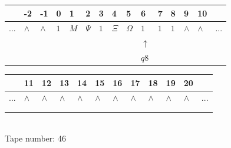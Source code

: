 \documentclass[11pt]{article}
\begin{document}
\begin{table}[H]
\centering
\begin{tabular}{lllllllllllllll}
 & -2 & -1 & 0 & 1 & 2 & 3 & 4 & 5 & 6 & 7 & 8 & 9 & 10 & \\
\hline
$...$ & \multicolumn{1}{|l|}{$\wedge$} & \multicolumn{1}{|l|}{$\wedge$} & \multicolumn{1}{|l|}{$1$} & \multicolumn{1}{|l|}{$M$} & \multicolumn{1}{|l|}{$\Psi$} & \multicolumn{1}{|l|}{$1$} & \multicolumn{1}{|l|}{$\Xi$} & \multicolumn{1}{|l|}{$\Omega$} & \multicolumn{1}{|l|}{$1$} & \multicolumn{1}{|l|}{$1$} & \multicolumn{1}{|l|}{$1$} & \multicolumn{1}{|l|}{$\wedge$} & \multicolumn{1}{|l|}{$\wedge$} & $...$\\
\hline
&  &  &  &  &  &  &  &  & $\uparrow$ &  &  &  &  &  \\
&  &  &  &  &  &  &  &  & $ q8 $ &  &  &  &  &  \\
\end{tabular}
\begin{tabular}{llllllllllll}
 & 11 & 12 & 13 & 14 & 15 & 16 & 17 & 18 & 19 & 20 & \\
\hline
$...$ & \multicolumn{1}{|l|}{$\wedge$} & \multicolumn{1}{|l|}{$\wedge$} & \multicolumn{1}{|l|}{$\wedge$} & \multicolumn{1}{|l|}{$\wedge$} & \multicolumn{1}{|l|}{$\wedge$} & \multicolumn{1}{|l|}{$\wedge$} & \multicolumn{1}{|l|}{$\wedge$} & \multicolumn{1}{|l|}{$\wedge$} & \multicolumn{1}{|l|}{$\wedge$} & \multicolumn{1}{|l|}{$\wedge$} & $...$\\
\hline
&  &  &  &  &  &  &  &  &  &  &  \\
&  &  &  &  &  &  &  &  &  &  &  \\
\end{tabular}
\\
Tape number: 46
\noindent\makebox[\linewidth]{\hdashrule{\textwidth}{1pt}{1pt}}\end{table}
\end{document}

